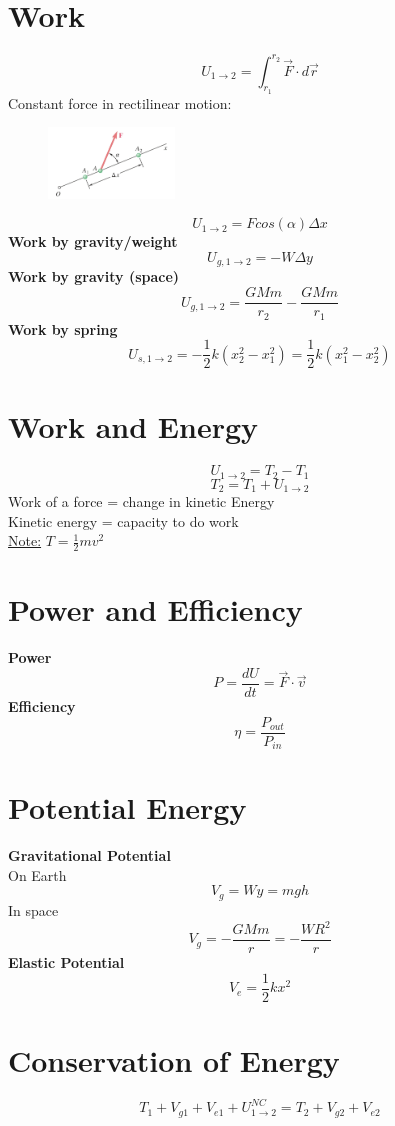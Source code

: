 \documentclass[10pt, fleqn]{article}
\begin{document}
\begin{multicols}{2}
\section*{Work}
\[U_{1\to2}=\int_{r_1}^{r_2}\vec{F}\cdot d\vec{r}\]
Constant force in rectilinear motion:
\begin{figure}[H]
    \includegraphics[width=0.3\textwidth]{work.png}
\end{figure}
\[U_{1\to2}=Fcos(\alpha)\Delta x\]
\textbf{Work by gravity/weight}
\[U_{g,1\to2}=-W\Delta y\]
\textbf{Work by gravity (space)}
\[U_{g,1\to2}=\frac{GMm}{r_2}-\frac{GMm}{r_1}\]
\textbf{Work by spring}
\[U_{s,1\to2}=-\frac{1}{2}k(x_2^2-x_1^2)=\frac{1}{2}k(x_1^2-x_2^2)\]
\section*{Work and Energy}
\[U_{1\to2}=T_2-T_1\]
\[T_2=T_1+U_{1\to2}\]
Work of a force = change in kinetic Energy\\
Kinetic energy = capacity to do work\\
\underline{Note:} $T=\frac{1}{2}mv^2$
\section*{Power and Efficiency}
\textbf{Power}
\[P=\frac{dU}{dt}=\vec{F}\cdot\vec{v}\]
\textbf{Efficiency}
\[\eta=\frac{P_{out}}{P_{in}}\]
\section*{Potential Energy}
\textbf{Gravitational Potential}\\
On Earth
\[V_g=Wy=mgh\]
In space
\[V_g=-\frac{GMm}{r}=-\frac{WR^2}{r}\]
\textbf{Elastic Potential}
\[V_e=\frac{1}{2}kx^2\]
\section*{Conservation of Energy}
\[T_1+V_{g1}+V_{e1}+U_{1\to2}^{NC}=T_2+V_{g2}+V_{e2}\]

\end{multicols}
\end{document}
